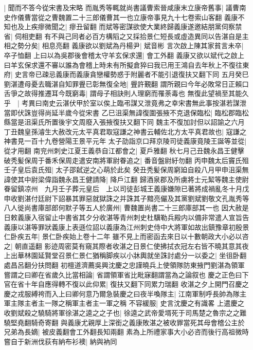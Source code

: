 |{
	聞而不答今從宋書及宋略}
而胤秀等輒就尚書議曹索晉咸康末立康帝舊事|{
	議曹南史作儀曹當從之曹魏置二十三郎儀曹其一也立康帝事見九十七卷索山客翻}
義康不知也及上疾瘳微聞之|{
	瘳丑留翻}
而斌等密謀欲使大業終歸義康遂邀結朋黨伺察禁省|{
	伺相吏翻}
有不與己同者必百方構䧟之又採拾景仁短長或虛造異同以告湛自是主相之勢分矣|{
	相息亮翻}
義康欲以劉斌為丹楊尹|{
	斌音彬}
言次啟上陳其家貧言未卒|{
	卒子恤翻}
上曰以為吳郡後會稽太守羊玄保求還|{
	會工外翻}
義康又欲以斌代之啟上曰羊玄保求還不審以誰為會稽上時未有所擬倉猝曰我已用王鴻自去年秋上不復往東府|{
	史言帝已疎忌義康而義康貪戀權勢惑于附麗者不能引退復扶又翻下同}
五月癸巳劉湛遭母憂去職湛自知罪舋已彰無復全地|{
	舋許覲翻}
謂所親曰今年必敗常日正賴口舌爭之故得推遷耳今既窮毒|{
	謂母子相訣則人理窮而罹荼毒也}
無復此望禍至其能久乎　|{
	考異曰南史云湛伏甲於室以俟上臨弔謀又泄竟弗之幸宋書無此事按湛若謀泄當即伏誅豈得尚延半歲今從宋書}
乙巳沮渠無諱復圍張掖不克退保臨松|{
	臨松郡臨松縣當是沮渠氏所置後宇文周廢入張掖復扶又翻下同}
魏主不復加討但以詔諭之六月丁丑魏皇孫濬生大赦改元太平真君取寇謙之神書云輔佐北方太平真君故也|{
	寇謙之神書見一百十九卷營陽王景平元年}
太子劭詣京口拜京陵司徒義康竟陵王誕等並從|{
	從才用翻}
南兖州刺史江夏王義恭自江都會之|{
	夏戶雅翻}
秋七月己丑魏永昌王健擊破秃髪保周于番禾保周走遣安南將軍尉眷追之|{
	番音盤尉紆勿翻}
丙申魏太后竇氏殂　壬子皇后袁氏殂|{
	太子邵弑逆之心萌於此矣}
癸丑秃髪保周窮廹自殺八月甲申沮渠無諱使其中尉梁偉詣魏永昌王健請降|{
	降戶江翻}
歸酒泉郡及所虜將士元絜等魏主使尉眷留鎮凉州　九月壬子葬元皇后　上以司徒彭城王義康嫌隙已著將成禍亂冬十月戊申收劉湛付廷尉下詔暴其罪惡就獄誅之并誅其子黯亮儼及其黨劉斌劉敬文孔胤秀等八人徙尚書庫部郎何默子等五人於廣州|{
	曹魏置尚書二十三郎庫部其一也}
因大赦是日敕義康入宿留止中書省其夕分收湛等青州刺史杜驥勒兵殿内以備非常遣人宣旨告義康以湛等罪狀義康上表遜位詔以義康為江州刺史侍中大將軍如故出鎮豫章初殷景仁卧疾五年|{
	景仁卧疾始上卷十二年}
雖不見上而密函去來日以十數朝政大小必以咨之|{
	朝直遥翻}
影迹周密莫有窺其際者收湛之日景仁使拂拭衣冠左右皆不曉其意其夜上出華林園延賢堂召景仁景仁猶稱脚疾以小牀輿就坐誅討處分一以委之|{
	坐徂卧翻處昌呂翻分扶問翻}
初檀道濟薦吳興沈慶之忠謹曉兵上使領隊防東掖門劉湛為領軍嘗謂之曰卿在省歲久比當相論|{
	省謂領軍省比毗寐翻謂當為之論叙也}
慶之正色曰下官在省十年自應得轉不復以此仰累|{
	復扶又翻下同累力瑞翻}
收湛之夕上開門召慶之慶之戎服縛袴而入上曰卿何意乃爾急裝慶之曰夜半喚隊主|{
	江南軍制呼長帥為隊主軍主隊主者主一隊之稱軍主者主一軍之稱}
不容緩服|{
	史言沈慶之有識畧}
上遣慶之收劉斌殺之驍騎將軍徐湛之逵之之子也|{
	徐逵之武帝愛壻死于司馬楚之魯宗之之難驍堅堯翻騎奇寄翻}
與義康尤親厚上深銜之義康敗湛之被收罪當死其母會稽公主於兄弟為長嫡|{
	被皮義翻會工外翻長知兩翻}
素為上所禮家事大小必咨而後行高祖微時嘗自于新洲伐荻有納布衫襖|{
	納與衲同}
